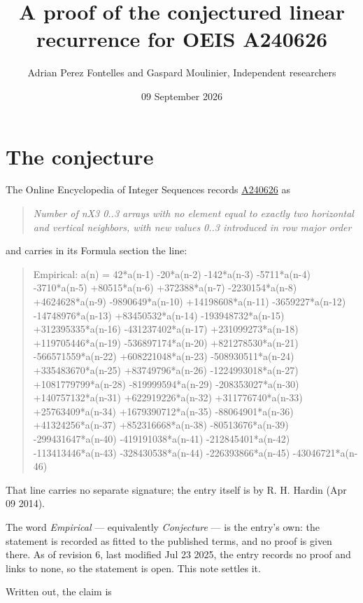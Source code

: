 \documentclass[11pt]{article}
\title{A proof of the conjectured linear recurrence for OEIS A240626}
\author{Adrian Perez Fontelles and Gaspard Moulinier, Independent researchers}
\date{09 September 2026}
\theoremstyle{definition}
\begin{document}
\maketitle
\section{The conjecture}

The Online Encyclopedia of Integer Sequences records \href{https://oeis.org/A240626}{A240626} as

\begin{quote}\itshape Number of nX3 0..3 arrays with no element equal to exactly two horizontal and vertical neighbors, with new values 0..3 introduced in row major order\end{quote}

and carries in its Formula section the line:

\begin{quote}\ttfamily Empirical: a(n) = 42*a(n-1) -20*a(n-2) -142*a(n-3) -5711*a(n-4) -3710*a(n-5) +80515*a(n-6) +372388*a(n-7) -2230154*a(n-8) +4624628*a(n-9) -9890649*a(n-10) +14198608*a(n-11) -3659227*a(n-12) -14748976*a(n-13) +83450532*a(n-14) -193948732*a(n-15) +312395335*a(n-16) -431237402*a(n-17) +231099273*a(n-18) +119705446*a(n-19) -536897174*a(n-20) +821278530*a(n-21) -566571559*a(n-22) +608221048*a(n-23) -508930511*a(n-24) +335483670*a(n-25) +83749796*a(n-26) -1224993018*a(n-27) +1081779799*a(n-28) -819999594*a(n-29) -208353027*a(n-30) +140757132*a(n-31) +622919226*a(n-32) +311776740*a(n-33) +25763409*a(n-34) +1679390712*a(n-35) -88064901*a(n-36) +41324256*a(n-37) +852316668*a(n-38) -80513676*a(n-39) -299431647*a(n-40) -419191038*a(n-41) -212845401*a(n-42) -113413446*a(n-43) -328430538*a(n-44) -226393866*a(n-45) -43046721*a(n-46)\end{quote}

That line carries no separate signature; the entry itself is by R. H. Hardin (Apr 09 2014).

The word {\itshape Empirical} --- equivalently {\itshape Conjecture} --- is the entry's own: the statement is recorded as fitted to the published terms, and no proof is given there. As of revision 6, last modified Jul 23 2025, the entry records no proof and links to none, so the statement is open. This note settles it.

Written out, the claim is
\end{document}
